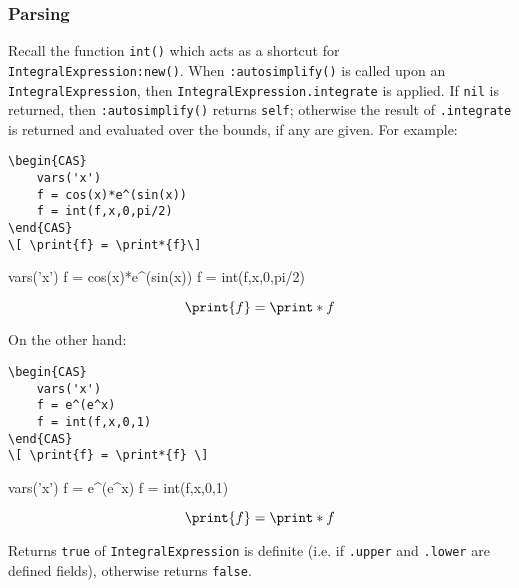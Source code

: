 \subsubsection*{Parsing}

Recall the function \texttt{int()} which acts as a shortcut for \texttt{IntegralExpression:new()}. When \texttt{:autosimplify()} is called upon an \texttt{IntegralExpression}, then \texttt{IntegralExpression.integrate} is applied. If \texttt{nil} is returned, then \texttt{:autosimplify()} returns \texttt{self}; otherwise the result of \texttt{.integrate} is returned and evaluated over the bounds, if any are given. For example:

\begin{codebox}
    \begin{verbatim}
\begin{CAS}
    vars('x')
    f = cos(x)*e^(sin(x))
    f = int(f,x,0,pi/2)
\end{CAS}
\[ \print{f} = \print*{f}\]
\end{verbatim}
\tcblower
\begin{CAS}
    vars('x')
    f = cos(x)*e^(sin(x))
    f = int(f,x,0,pi/2)
\end{CAS}
\[ \print{f} = \print*{f}\]
\end{codebox}

On the other hand:
\begin{codebox}
    \begin{verbatim}
\begin{CAS}
    vars('x')
    f = e^(e^x)
    f = int(f,x,0,1)
\end{CAS}
\[ \print{f} = \print*{f} \]
\end{verbatim}
\tcblower
\begin{CAS}
    vars('x')
    f = e^(e^x)
    f = int(f,x,0,1)
\end{CAS}
\[ \print{f} = \print*{f} \]
\end{codebox}


Returns \texttt{true} of \texttt{IntegralExpression} is definite (i.e. if \texttt{.upper} and \texttt{.lower} are defined fields), otherwise returns \texttt{false}.